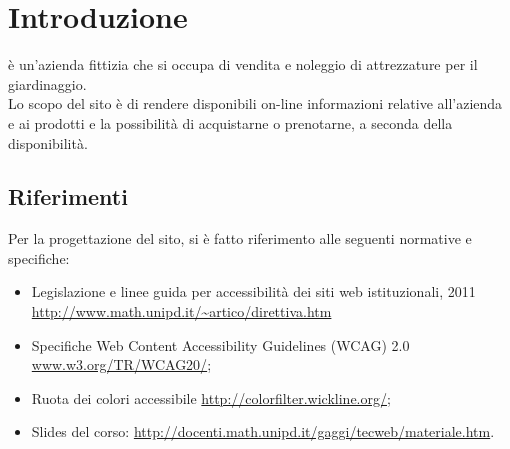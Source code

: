 \section{Introduzione}{
	\textbf{\ggt}  è un'azienda fittizia che si occupa di vendita e noleggio di attrezzature per il giardinaggio. \\
	Lo scopo del sito è di rendere disponibili on-line informazioni relative all'azienda e ai prodotti e la possibilità di acquistarne o prenotarne, a seconda della disponibilità. 
	
    \subsection{Riferimenti}{
		Per la progettazione del sito, si è fatto riferimento alle seguenti normative e specifiche:
		\begin{itemize}\itemsep0.5pt
			\item Legislazione e linee guida per accessibilità dei siti web istituzionali, 2011 \url{http://www.math.unipd.it/~artico/direttiva.htm}
			\item Specifiche Web Content Accessibility Guidelines (WCAG) 2.0 \url{www.w3.org/TR/WCAG20/};
			\item Ruota dei colori accessibile \url{http://colorfilter.wickline.org/};
			\item Slides del corso: \url{http://docenti.math.unipd.it/gaggi/tecweb/materiale.htm}.
		\end{itemize}
    }
}

